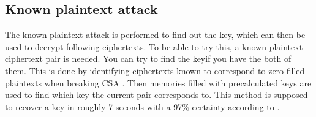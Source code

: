 \subsection{Known plaintext attack}
The known plaintext attack is performed to find out the key, which can 
then be used to decrypt following ciphertexts. To be able to try this, 
a known plaintext-ciphertext pair is needed. You can try to find the keyif you have the both of them. This is done by identifying ciphertexts 
known to correspond to zero-filled plaintexts when breaking CSA 
\citep{Breaking:2012}. Then memories filled with precalculated keys are 
used to find which key the current pair corresponds to. This method is 
supposed to recover a key in roughly 7 seconds with a 97\% certainty 
according to \citet{Breaking:2012}.
